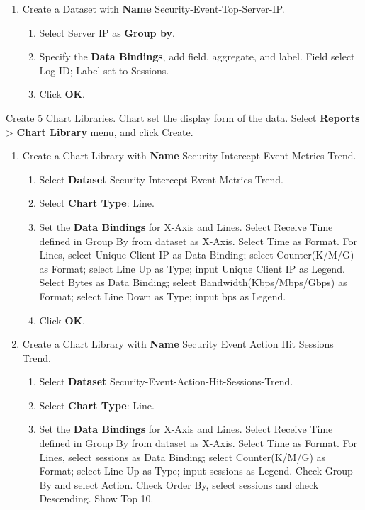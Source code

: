 \begin{description}
\begin{enumerate}
\begin{enumerate}
        \end{enumerate}
        \item Create a Dataset with \textbf{Name} Security-Event-Top-Server-IP.
        \begin{enumerate}
            \item 	Select Server IP as \textbf{Group by}. 
            \item 	Specify the \textbf{Data Bindings}, add field, aggregate, and label. Field select Log ID; Label set to Sessions. 
            \item 	Click \textbf{OK}.
        \end{enumerate}
    \end{enumerate}
    \item[STEP 2.]	Create 5 Chart Libraries. Chart set the display form of the data. Select \textbf{Reports} > \textbf{Chart Library} menu, and click Create.
    \begin{enumerate}
        \item Create a Chart Library with \textbf{Name} Security Intercept Event Metrics Trend.
        \begin{enumerate}
            \item 	Select \textbf{Dataset} Security-Intercept-Event-Metrics-Trend.
            \item 	Select \textbf{Chart Type}: Line.
            \item 	Set the \textbf{Data Bindings} for X-Axis and Lines. Select Receive Time defined in Group By from dataset as X-Axis. Select Time as Format. For Lines, select Unique Client IP as Data Binding; select Counter(K/M/G) as Format; select Line Up as Type; input Unique Client IP as Legend. Select Bytes as Data Binding; select Bandwidth(Kbps/Mbps/Gbps) as Format; select Line Down as Type; input bps as Legend.
            \item 	Click \textbf{OK}.
        \end{enumerate}
        \item Create a Chart Library with \textbf{Name} Security Event Action Hit Sessions Trend.
        \begin{enumerate}
            \item 	Select \textbf{Dataset} Security-Event-Action-Hit-Sessions-Trend.
            \item 	Select \textbf{Chart Type}: Line.
            \item 	Set the \textbf{Data Bindings} for X-Axis and Lines. Select Receive Time defined in Group By from dataset as X-Axis. Select Time as Format. For Lines, select sessions as Data Binding; select Counter(K/M/G) as Format; select Line Up as Type; input sessions as Legend. Check Group By and select Action. Check Order By, select sessions and check Descending. Show Top 10.

\end{enumerate}
\end{enumerate}
\end{description}
